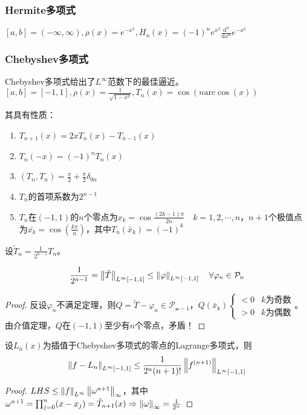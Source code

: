 \documentclass{ctexart}
\begin{document}
\subsubsection{Hermite多项式}
$[a,b]=(-\infty,\infty),\rho(x)=e^{-x^2},H_n(x)=(-1)^ne^{x^2}\frac{\mathrm{d}^n}{\mathrm{d}x^n}e^{-x^2}$

\subsubsection{Chebyshev多项式}
Chebyshev多项式给出了$L^\infty$范数下的最佳逼近。
$[a,b]=[-1,1],\rho(x)=\frac{1}{\sqrt{1-x^2}},T_n(x)=\cos(n \mathrm{arc}\cos(x))$

其具有性质：
\begin{enumerate}
\item $T_{n+1}(x)=2xT_n(x)-T_{n-1}(x)$
\item $T_n(-x)=(-1)^n T_n(x)$
\item $(T_n,T_n)=\frac{\pi}{2}+\frac{\pi}{2}\delta_{0n}$
\item $T_n$的首项系数为$2^{n-1}$
\item $T_n$在$(-1,1)$的$n$个零点为$x_k=\cos\frac{(2k-1)\pi}{2n}\quad k=1,2,\cdots,n$，$n+1$个极值点为$\bar{x_k}=\cos(\frac{k\pi}{n})$，其中$T_n(\bar x_k)=(-1)^k$
\end{enumerate}

设$\tilde{T}_n=\frac{1}{2^{n-1}}T_n$。
\begin{Thm}
\[\frac{1}{2^{n-1}}=\left\|\tilde{T} \right\|_{L^\infty[-1,1]}\leq\left\|\varphi \right\|_{L^\infty[-1,1]}\quad \forall \varphi_n\in \mathcal{P}_n\]
\end{Thm}

\begin{proof}
反设$\varphi_n$不满足定理，则$Q=\tilde{T}-\varphi_n\in \mathcal{P_{n-1}}$，$Q(\bar{x}_k)\begin{cases}<0 & k\text{为奇数}\\ >0 & k\text{为偶数}\end{cases}$。由介值定理，$Q$在$(-1,1)$至少有$n$个零点，矛盾！
\end{proof}

\begin{Thm}
设$L_n(x)$为插值于Chebyshev多项式的零点的Lagrange多项式，则
\[\left\|f-L_n \right\|_{L^\infty[-1,1]}\leq\frac{1}{2^n(n+1)!}\left\|f^{(n+1)} \right\|_{L^{\infty}[-1,1]}\]
\end{Thm}
\begin{proof}
$LHS\leq \left\|f \right\|_{L^\infty}\left\|\omega^{n+1} \right\|_{\infty}$，其中$\omega^{n+1}=\prod_{j=0}^n (x-x_j)=\tilde{T}_{n+1}(x)\Rightarrow \left\|\omega \right\|_\infty=\frac{1}{2^n}$

\end{proof}
\end{document}
